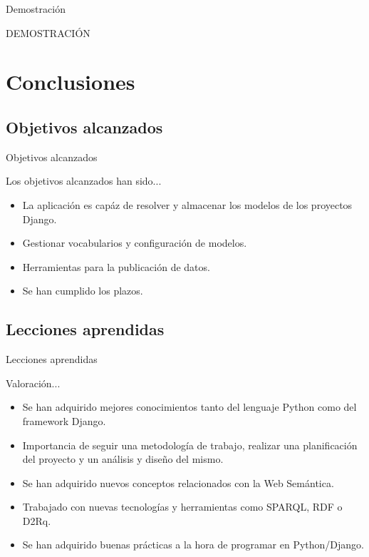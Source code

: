 \documentclass[spanish,xcolor=table,svgnames]{beamer}
\begin{document}
\begin{frame}{Demostración}
  \begin{center}
    \Huge{DEMOSTRACIÓN}
  \end{center}
\end{frame}


\section{Conclusiones}

\subsection*{Objetivos alcanzados}
\begin{frame}{Objetivos alcanzados}
\begin{block}{Los objetivos alcanzados han sido...}
  \begin{itemize}
    \item La aplicación es capáz de resolver y almacenar los modelos de los
      proyectos Django.
    \item Gestionar vocabularios y configuración de modelos.
    \item Herramientas para la publicación de datos.
    \item Se han cumplido los plazos.
  \end{itemize}
\end{block}
\end{frame}

\subsection*{Lecciones aprendidas}
\begin{frame}{Lecciones aprendidas}
\begin{block}{Valoración...}
  \begin{itemize}
    \item Se han adquirido mejores conocimientos tanto del lenguaje Python como
      del framework Django.
    \item Importancia de seguir una metodología de trabajo, realizar una
      planificación del proyecto y un análisis y diseño del mismo.
    \item Se han adquirido nuevos conceptos relacionados con la Web Semántica.
    \item Trabajado con nuevas tecnologías y herramientas como SPARQL, RDF o
      D2Rq.
    \item Se han adquirido buenas prácticas a la hora de programar en
      Python/Django.
  \end{itemize}
\end{block}
\end{frame}
\end{document}
